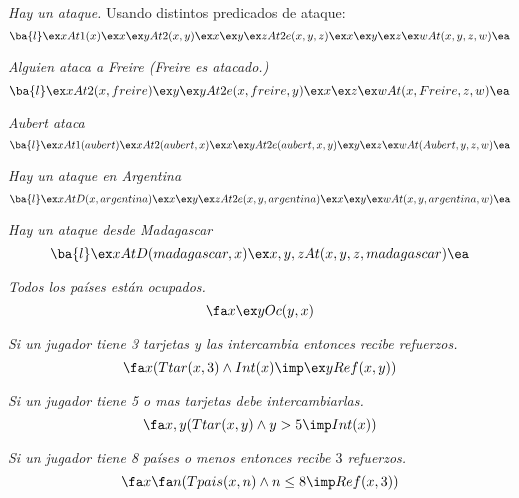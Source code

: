 \documentclass[11pt,letterpaper]{article}
\begin{document}
 \item \textit{Hay un ataque.} Usando distintos predicados de ataque:
     \[
     \ba{l}
     \ex x At1(x)\\
     \ex x\ex y At2(x,y)\\
     \ex x \ex y\ex z At2e(x,y,z)\\
     \ex x\ex y\ex z\ex w At(x,y,z,w)\\
     \ea
     \]
     
 \item \textit{Alguien ataca a Freire (Freire es atacado.)}
     \[
     \ba{l}
     \ex x At2(x,freire)\\
     \ex y\ex y At2e(x,freire,y)\\
     \ex x\ex z\ex w At(x,Freire,z,w)
     \ea
     \]
 \item \textit{Aubert ataca}
      \[
      \ba{l}
        \ex x At1(aubert)\\
       \ex x At2(aubert,x)\\
       \ex x\ex y At2e(aubert,x,y)\\
      \ex y\ex z\ex w At(Aubert,y,z,w)
      \ea
      \]
 \item \textit{Hay un ataque en Argentina}
  \[
  \ba{l}
  \ex x AtD(x,argentina)\\
  \ex x \ex y\ex z At2e(x,y,argentina)\\
  \ex x\ex y\ex w At(x,y,argentina,w)
  \ea
  \]

 \item \textit{Hay un ataque desde Madagascar}
    \[
    \ba{l}
    \ex x AtD(madagascar,x)\\   
    \ex x,y,z At(x,y,z,madagascar)
    \ea
    \]

 \item \textit{Todos los pa\'ises están ocupados.}
  \[
  \fa x\ex y Oc(y,x)
  \]
    
 \item \textit{Si un jugador tiene 3 tarjetas y las intercambia entonces recibe
  refuerzos.}
  \[
  \fa x (Ttar(x,3)\land Int(x)\imp \ex y Ref(x,y))
  \]
  
 \item \textit{Si un jugador tiene 5 o mas tarjetas debe intercambiarlas.}
  \[
  \fa x,y(Ttar(x,y) \land y>5\imp Int(x))
  \]

 \item \textit{Si un jugador tiene 8 pa\'ises o menos  entonces recibe $3$
  refuerzos.}
  \[
  \fa x\fa n(Tpais(x,n)\land n\leq 8 \imp Ref(x,3))
  \]
 
\end{document}
